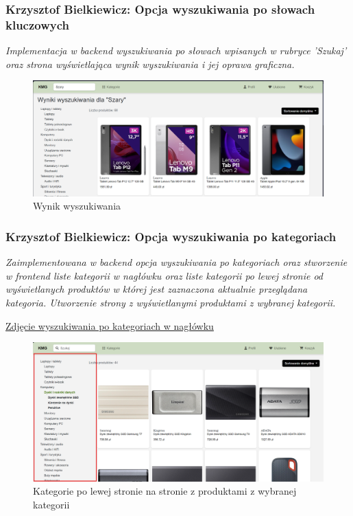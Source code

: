\documentclass[12pt,a4paper,oneside]{article}
\theoremstyle{definition}
\numberwithin{equation}{section}
\begin{document}
\subsubsection{Krzysztof Bielkiewicz: Opcja wyszukiwania po słowach kluczowych}
\label{1.3.3}
\textit{Implementacja w backend wyszukiwania po słowach wpisanych w rubryce 'Szukaj'
oraz strona wyświetlająca wynik wyszukiwania i jej oprawa graficzna.}
\begin{figure}[H]
    \centering
    \includegraphics[width=0.8\columnwidth]{images/krzysztofBImages/wyszukiwanie.png}
    \caption{Wynik wyszukiwania}
    \label{search-value}
\end{figure}

    
\subsubsection{Krzysztof Bielkiewicz: Opcja wyszukiwania po kategoriach}
\label{1.3.4}
    \textit{Zaimplementowana w backend opcja wyszukiwania po kategoriach
     oraz stworzenie w frontend liste kategorii w nagłówku
      oraz liste kategorii po lewej stronie od wyświetlanych produktów w której jest zaznaczona
      aktualnie przeglądana kategoria. Utworzenie strony z wyświetlanymi produktami z wybranej kategorii.}
    \begin{center}
        \hyperref[header-categories]{Zdjęcie wyszukiwania po kategoriach w nagłówku}
    \end{center}

    \begin{figure}[H]
        \centering
        \includegraphics[width=0.8\columnwidth]{images/krzysztofBImages/lewe-kategorie.png}
        \caption{Kategorie po lewej stronie na stronie z produktami z wybranej kategorii}
        \label{left-categories}
    \end{figure}
\end{document}
